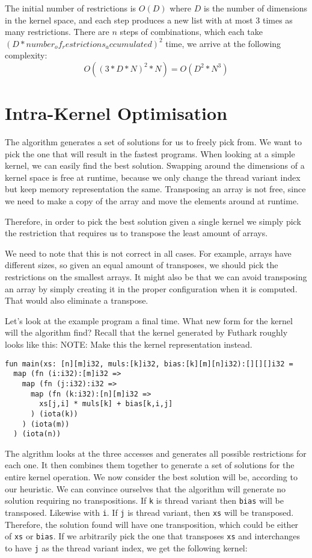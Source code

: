 \documentclass{article}
\begin{document}
The initial number of restrictions is $O(D)$ where $D$ is the number of dimensions in the kernel space, and each step produces a new list with at
most 3 times as many restrictions. There are $n$ steps of combinations, which each take $(D * number_of_restrictions_accumulated)^2$ time, we arrive at the
following complexity:
$$ O( {(3*D*N)}^2*N ) = O(D^2*N^3) $$

\section{Intra-Kernel Optimisation}

The algorithm generates a set of solutions for us to freely pick from. We want to pick the one that will result in the fastest programs. When looking at a
simple kernel, we can easily find the best solution. Swapping around the dimensions of a kernel space is free at runtime, because we only change the thread
variant index but keep memory representation the same. Transposing an array is not free, since we need to make a copy of the array and move the elements around
at runtime.

Therefore, in order to pick the best solution given a single kernel we simply pick the restriction that requires us to transpose the least amount of arrays.

We need to note that this is not correct in all cases. For example, arrays have different sizes, so given an equal amount of transposes, we should pick the
restrictions on the smallest arrays. It might also be that we can avoid transposing an array by simply creating it in the proper configuration when it is
computed. That would also eliminate a transpose.

Let's look at the example program a final time. What new form for the kernel will the algorithm find? Recall that the kernel generated by Futhark roughly looks
like this:
NOTE: Make this the kernel representation instead.
\begin{verbatim}
fun main(xs: [n][m]i32, muls:[k]i32, bias:[k][m][n]i32):[][][]i32 =
  map (fn (i:i32):[m]i32 =>
    map (fn (j:i32):i32 => 
      map (fn (k:i32):[n][m]i32 =>
        xs[j,i] * muls[k] + bias[k,i,j]
      ) (iota(k))
    ) (iota(m))
  ) (iota(n))
\end{verbatim}

The algrithm looks at the three accesses and generates all possible restrictions for each one. It then combines them together to generate a set of solutions for
the entire kernel operation. We now consider the best solution will be, according to our heuristic. We can convince ourselves that the algorithm will generate
no solution requiring no transpositions. If \verb`k` is thread variant then \verb`bias` will be transposed. Likewise with \verb`i`. If \verb`j` is thread
variant, then \verb`xs` will be transposed. Therefore, the solution found will have one transposition, which could be either of \verb`xs` or \verb`bias`. If we
arbitrarily pick the one that transposes \verb`xs` and interchanges to have \verb`j` as the thread variant index, we get the following kernel:
\end{document}
